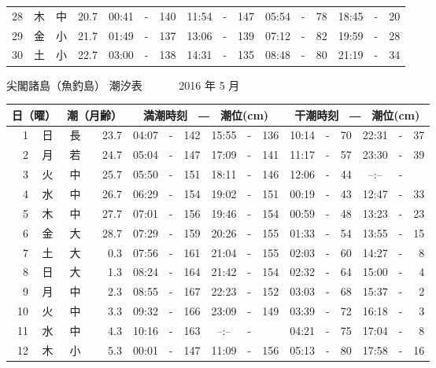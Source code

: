 \documentclass[12pt.a4j]{jsarticle}
\begin{document}
\begin{center}
\begin{table}[ht]
\begin{tabular}{|rc|cr|ccrccr|ccrccr|}
28 & 木 & 中 & 20.7 &  00:41 &-& 140  &  11:54 &-& 147  &   05:54 &-&  78  &   18:45 &-&  20  \\
29 & 金 & 小 & 21.7 &  01:49 &-& 137  &  13:06 &-& 139  &   07:12 &-&  82  &   19:59 &-&  28  \\
30 & 土 & 小 & 22.7 &  03:00 &-& 138  &  14:31 &-& 135  &   08:48 &-&  80  &   21:19 &-&  34  \\
   \hline
   \end{tabular}
\end{table}
\newpage
 {\LARGE 尖閣諸島（魚釣島）  潮汐表　　　}
 {\large 2016 年  5 月}\\
 \begin{table}[ht]
    \begin{tabular}{|rc|cr|ccrccr|ccrccr|}
    \hline
    \multicolumn{2}{|c|}{日（曜）} & \multicolumn{2}{c|}{潮（月齢）} & \multicolumn{6}{c|}{満潮時刻　―　潮位(cm)} & \multicolumn{6}{c|}{干潮時刻　―　潮位(cm)} \\
 \hline
 1 & 日 & 長 & 23.7 &  04:07 &-& 142  &  15:55 &-& 136  &   10:14 &-&  70  &   22:31 &-&  37  \\
 2 & 月 & 若 & 24.7 &  05:04 &-& 147  &  17:09 &-& 141  &   11:17 &-&  57  &   23:30 &-&  39  \\
 3 & 火 & 中 & 25.7 &  05:50 &-& 151  &  18:11 &-& 146  &   12:06 &-&  44  &   --:-- &-&     \\
 4 & 水 & 中 & 26.7 &  06:29 &-& 154  &  19:02 &-& 151  &   00:19 &-&  43  &   12:47 &-&  33  \\
 5 & 木 & 中 & 27.7 &  07:01 &-& 156  &  19:46 &-& 154  &   00:59 &-&  48  &   13:23 &-&  23  \\
 6 & 金 & 大 & 28.7 &  07:29 &-& 159  &  20:26 &-& 155  &   01:33 &-&  54  &   13:55 &-&  15  \\
 7 & 土 & 大 &  0.3 &  07:56 &-& 161  &  21:04 &-& 155  &   02:03 &-&  60  &   14:27 &-&   8  \\
 8 & 日 & 大 &  1.3 &  08:24 &-& 164  &  21:42 &-& 154  &   02:32 &-&  64  &   15:00 &-&   4  \\
 9 & 月 & 中 &  2.3 &  08:55 &-& 167  &  22:23 &-& 152  &   03:03 &-&  68  &   15:37 &-&   2  \\
10 & 火 & 中 &  3.3 &  09:32 &-& 166  &  23:09 &-& 149  &   03:39 &-&  72  &   16:18 &-&   3  \\
11 & 水 & 中 &  4.3 &  10:16 &-& 163  &  --:-- &-&     &   04:21 &-&  75  &   17:04 &-&   8  \\
12 & 木 & 小 &  5.3 &  00:01 &-& 147  &  11:09 &-& 156  &   05:13 &-&  80  &   17:58 &-&  16  \\

\end{tabular}
\end{table}
\end{center}
\end{document}
